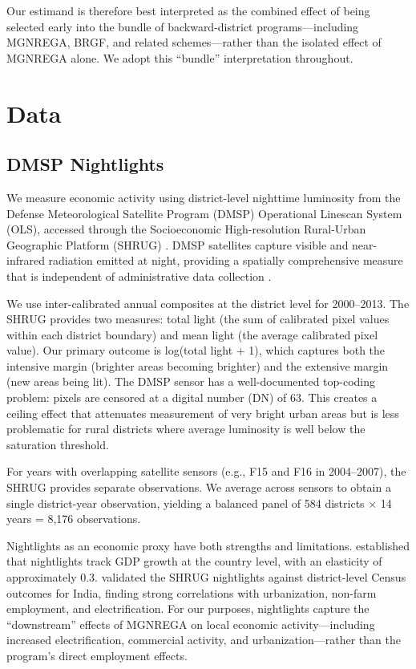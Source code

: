 \documentclass[12pt]{article}
\begin{document}
Our estimand is therefore best interpreted as the combined effect of being selected early into the bundle of backward-district programs---including MGNREGA, BRGF, and related schemes---rather than the isolated effect of MGNREGA alone. We adopt this ``bundle'' interpretation throughout.


\section{Data}

\subsection{DMSP Nightlights}

We measure economic activity using district-level nighttime luminosity from the Defense Meteorological Satellite Program (DMSP) Operational Linescan System (OLS), accessed through the Socioeconomic High-resolution Rural-Urban Geographic Platform (SHRUG) \citep{asher2021development}. DMSP satellites capture visible and near-infrared radiation emitted at night, providing a spatially comprehensive measure that is independent of administrative data collection \citep{henderson2012measuring}.

We use inter-calibrated annual composites at the district level for 2000--2013. The SHRUG provides two measures: total light (the sum of calibrated pixel values within each district boundary) and mean light (the average calibrated pixel value). Our primary outcome is log(total light + 1), which captures both the intensive margin (brighter areas becoming brighter) and the extensive margin (new areas being lit). The DMSP sensor has a well-documented top-coding problem: pixels are censored at a digital number (DN) of 63. This creates a ceiling effect that attenuates measurement of very bright urban areas but is less problematic for rural districts where average luminosity is well below the saturation threshold.

For years with overlapping satellite sensors (e.g., F15 and F16 in 2004--2007), the SHRUG provides separate observations. We average across sensors to obtain a single district-year observation, yielding a balanced panel of 584 districts $\times$ 14 years = 8,176 observations.

Nightlights as an economic proxy have both strengths and limitations. \citet{henderson2012measuring} established that nightlights track GDP growth at the country level, with an elasticity of approximately 0.3. \citet{asher2021development} validated the SHRUG nightlights against district-level Census outcomes for India, finding strong correlations with urbanization, non-farm employment, and electrification. For our purposes, nightlights capture the ``downstream'' effects of MGNREGA on local economic activity---including increased electrification, commercial activity, and urbanization---rather than the program's direct employment effects.
\end{document}
